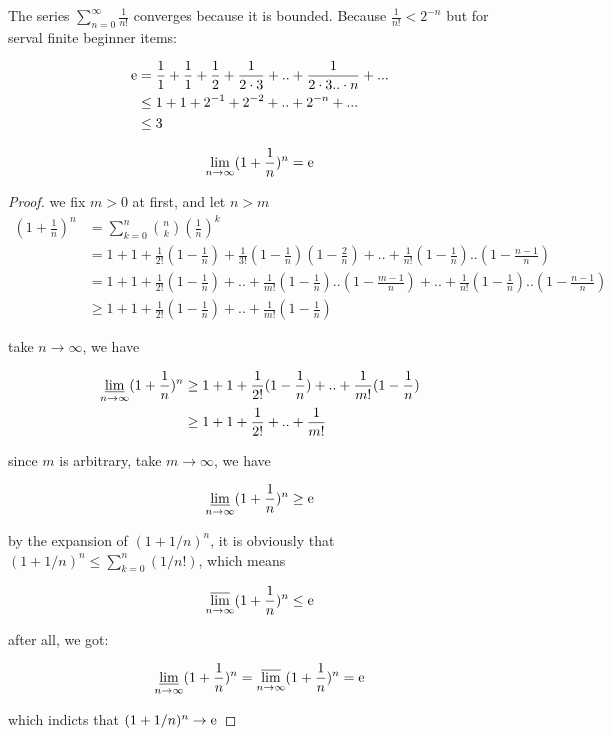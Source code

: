 \begin{remark}
    The series $\sum_{n=0}^{\infty}\frac{1}{n!}$ converges because it is bounded.
    Because $\frac{1}{n!} < 2^{-n}$ but for serval finite beginner items:

    \begin{align*}
        \mathrm{e} & = \frac{1}{1} + \frac{1}{1} +  \frac{1}{2} + \frac{1}{2\cdot 3} + .. + \frac{1}{2\cdot 3 .. \cdot n} + ...\\
        & \le 1 + 1 + 2^{-1} + 2^{-2} + .. + 2^{-n} + ...\\
        & \le 3
    \end{align*}
\end{remark}

\begin{thm}
    \[
        \lim_{n \to \infty}(1+\frac{1}{n})^n = \mathrm{e}
    \]
\end{thm}

\begin{proof}
    we fix $m > 0$ at first, and let $n > m$
    \begin{align*}
        (1+\frac{1}{n})^{n} &= \sum_{k=0}^{n}\binom{n}{k}(\frac{1}{n})^k \\
        &= 1 + 1 + \frac{1}{2!}(1-\frac{1}{n}) +\frac{1}{3!}(1-\frac{1}{n})(1-\frac{2}{n}) + .. + \frac{1}{n!}(1-\frac{1}{n})..(1-\frac{n-1}{n}) \\
        &= 1 + 1 + \frac{1}{2!}(1-\frac{1}{n}) + .. + \frac{1}{m!}(1-\frac{1}{n})..(1-\frac{m-1}{n}) + .. + \frac{1}{n!}(1-\frac{1}{n})..(1-\frac{n-1}{n})\\
        & \ge 1 + 1 + \frac{1}{2!}(1-\frac{1}{n}) + .. + \frac{1}{m!}(1-\frac{1}{n})
    \end{align*}

    take $n \to \infty$, we have

    \begin{align*}
        \varliminf_{n \to \infty}(1+\frac{1}{n})^n &\ge 1 + 1 + \frac{1}{2!}(1-\frac{1}{n}) + .. + \frac{1}{m!}(1-\frac{1}{n}) \\
        &\ge 1 + 1 + \frac{1}{2!} + .. + \frac{1}{m!}
    \end{align*}

    since $m$ is arbitrary, take $m \to \infty$, we have

    \[
        \varliminf_{n \to \infty}(1+\frac{1}{n})^n \ge \mathrm{e}
    \]

    by the expansion of $(1+1/n)^n$, it is obviously that $(1+1/n)^n \le \sum_{k=0}^n(1/n!)$, which means

    \[
        \varlimsup_{n \to \infty}(1+\frac{1}{n})^n \le \mathrm{e}
    \]

    after all, we got:

    \[
        \varliminf_{n \to \infty}(1+\frac{1}{n})^n = \varlimsup_{n \to \infty}(1+\frac{1}{n})^n = \mathrm{e}
    \]

    which indicts that $(1+1/n)^n \to \mathrm{e}$
\end{proof}

